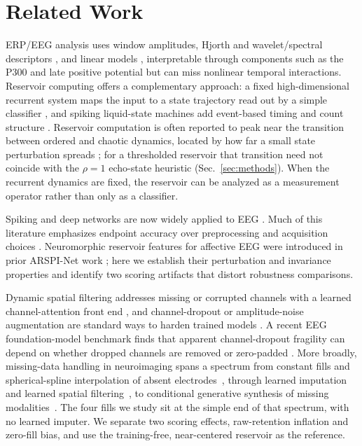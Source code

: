 \documentclass[conference]{IEEEtran}
\begin{document}
\section{Related Work}
\label{sec:related}
ERP/EEG analysis uses window amplitudes, Hjorth \cite{hjorth1970eeg} and wavelet/spectral descriptors \cite{subasi2007eeg}, and linear models \cite{blankertz2011singletrial}, interpretable through components such as the P300 and late positive potential \cite{makeig2002dynamic} but can miss nonlinear temporal interactions. Reservoir computing offers a complementary approach: a fixed high-dimensional recurrent system maps the input to a state trajectory read out by a simple classifier \cite{maass2002real,jaeger2001echo,jaeger2004harnessing,lukosevicius2009reservoir}, and spiking liquid-state machines add event-based timing and count structure \cite{diehl2015unsupervised,roy2019towards}. Reservoir computation is often reported to peak near the transition between ordered and chaotic dynamics, located by how far a small state perturbation spreads \cite{bertschinger2004realtime,legenstein2007edge}; for a thresholded reservoir that transition need not coincide with the $\rho=1$ echo-state heuristic \cite{jaeger2001echo} (Sec.~\ref{sec:methods}). When the recurrent dynamics are fixed, the reservoir can be analyzed as a measurement operator rather than only as a classifier.

Spiking and deep networks are now widely applied to EEG \cite{gong2023sglnet,lawhern2018eegnet,craik2019deep}. Much of this literature emphasizes endpoint accuracy over preprocessing and acquisition choices \cite{delpup2025preprocessing,kornblith2019similarity}. Neuromorphic reservoir features for affective EEG were introduced in prior ARSPI-Net work \cite{lane2023arspi,lane2024arspi}; here we establish their perturbation and invariance properties and identify two scoring artifacts that distort robustness comparisons.

Dynamic spatial filtering addresses missing or corrupted channels with a learned channel-attention front end \cite{banville2022dsf}, and channel-dropout or amplitude-noise augmentation are standard ways to harden trained models \cite{rommel2022augment}. A recent EEG foundation-model benchmark finds that apparent channel-dropout fragility can depend on whether dropped channels are removed or zero-padded \cite{sirca2026beyond}. More broadly, missing-data handling in neuroimaging spans a spectrum from constant fills and spherical-spline interpolation of absent electrodes~\cite{perrin1989spherical}, through learned imputation and learned spatial filtering~\cite{banville2022dsf}, to conditional generative synthesis of missing modalities~\cite{bi2024graymatters,hu2025gmldm}. The four fills we study sit at the simple end of that spectrum, with no learned imputer. We separate two scoring effects, raw-retention inflation and zero-fill bias, and use the training-free, near-centered reservoir as the reference.
\end{document}
